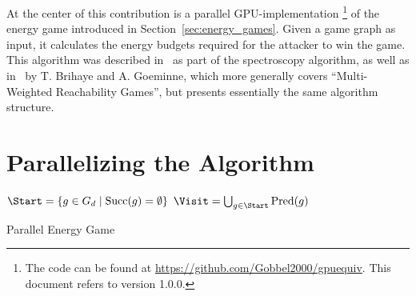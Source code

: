 At the center of this contribution is a parallel GPU-implementation%
\footnote{The code can be found at \url{https://github.com/Gobbel2000/gpuequiv}.
This document refers to version 1.0.0.}
of the energy game introduced in Section~\ref{sec:energy_games}.
Given a game graph as input, it calculates the energy budgets
required for the attacker to win the game.
This algorithm was described in~\cite{bisping2023process} as part of the
spectroscopy algorithm, as well as in~\cite{brihaye2023multi} by T. Brihaye and
A. Goeminne, which more generally covers
\enquote{Multi-Weighted Reachability Games},
but presents essentially the same algorithm structure.

\section{Parallelizing the Algorithm}

\begin{algorithm}[ht]
    \DontPrintSemicolon

    $\Start = \{g \in G_d \mid \mathrm{Succ}(g) = \emptyset\}$\;
    $\Visit = \bigcup_{g \in \Start} \mathrm{Pred}(g)$\;

    \BlankLine
    \Return{\Energies}

    \caption{Parallel Energy Game}\label{alg:energy_game}
\end{algorithm}

